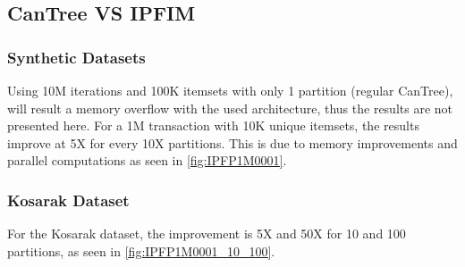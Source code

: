 \subsection{CanTree VS IPFIM}
\subsubsection{Synthetic Datasets}
Using 10M iterations and 100K itemsets with only 1 partition (regular CanTree), will result a memory overflow with the used architecture, thus the results are not presented here. For a 1M transaction with 10K unique itemsets, the results improve at 5X for every 10X partitions. This is due to memory improvements and parallel computations as seen in \autoref{fig:IPFP1M0001}.

\subsubsection{Kosarak Dataset}
For the Kosarak dataset, the improvement is 5X and 50X for 10 and 100 partitions, as seen in \autoref{fig:IPFP1M0001_10_100}.

